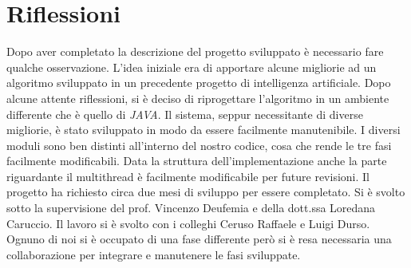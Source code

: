 \section{Riflessioni}
Dopo aver completato la descrizione del progetto sviluppato è necessario fare qualche osservazione.
L'idea iniziale era di apportare alcune migliorie ad un algoritmo sviluppato in un precedente progetto di intelligenza artificiale\cite{tesinaIA}. Dopo alcune attente riflessioni, si è deciso di riprogettare l'algoritmo in un ambiente differente che è quello di \emph{JAVA}.
Il sistema, seppur necessitante di diverse migliorie, è stato sviluppato in modo da essere facilmente manutenibile. I diversi moduli sono ben distinti all'interno del nostro codice, cosa che rende le tre fasi facilmente modificabili. Data la struttura dell'implementazione anche la parte riguardante il multithread è facilmente modificabile per future revisioni.
Il progetto ha richiesto circa due mesi di sviluppo per essere completato. Si è svolto sotto la supervisione del prof. Vincenzo Deufemia e della dott.ssa Loredana Caruccio. Il lavoro si è svolto con i colleghi Ceruso Raffaele e Luigi Durso. Ognuno di noi si è occupato di una fase differente però si è resa necessaria una collaborazione per integrare e manutenere le fasi sviluppate. 